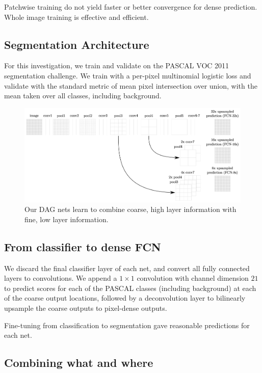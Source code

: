 \documentclass[a4paper,12pt]{article}
\begin{document}
Patchwise training do not yield faster or better convergence for dense prediction. Whole image training is effective and efficient.

\subsection{Segmentation Architecture}

For this investigation, we train and validate on the PASCAL VOC 2011 segmentation challenge. We train with a per-pixel multinomial logistic loss and validate with the standard metric of mean pixel intersection over union, with the mean taken over all classes, including background.

\begin{figure}[ht]
	\includegraphics[width=\columnwidth]{fcn.png}
	\caption{Our DAG nets learn to combine coarse, high layer information with fine, low layer information.}
\end{figure}

\subsection{From classifier to dense FCN}

We discard the final classifier layer of each net, and convert all fully connected layers to convolutions. We append a $1 \times 1$ convolution with channel dimension $21$ to predict scores for each of the PASCAL classes (including background) at each of the coarse output locations, followed by a deconvolution layer to bilinearly upsample the coarse outputs to pixel-dense outputs.

Fine-tuning from classification to segmentation gave reasonable predictions for each net.

\subsection{Combining what and where}
\end{document}
